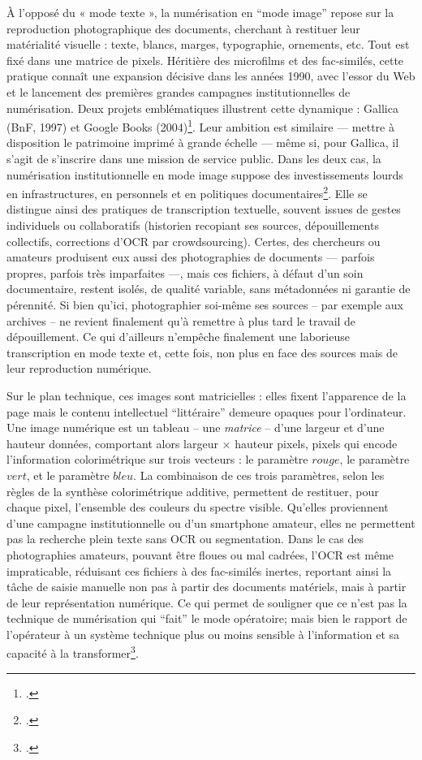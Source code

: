 À l’opposé du « mode texte », la numérisation en \enquote{mode image} repose sur la reproduction photographique des documents, cherchant à restituer leur matérialité visuelle : texte, blancs, marges, typographie, ornements, etc. Tout est fixé dans une matrice de pixels. Héritière des microfilms et des fac-similés, cette pratique connaît une expansion décisive dans les années 1990, avec l’essor du Web et le lancement des premières grandes campagnes institutionnelles de numérisation. Deux projets emblématiques illustrent cette dynamique : Gallica (BnF, 1997) et Google Books (2004)\footcite[][]{bermesbook}. Leur ambition est similaire — mettre à disposition le patrimoine imprimé à grande échelle — même si, pour Gallica, il s'agit de s’inscrire dans une mission de service public. Dans les deux cas, la numérisation institutionnelle en mode image suppose des investissements lourds en infrastructures, en personnels et en politiques documentaires\footcite[][p. 66-88]{claerr}. Elle se distingue ainsi des pratiques de transcription textuelle, souvent issues de gestes individuels ou collaboratifs (historien recopiant ses sources, dépouillements collectifs, corrections d’OCR par crowdsourcing). Certes, des chercheurs ou amateurs produisent eux aussi des photographies de documents — parfois propres, parfois très imparfaites —, mais ces fichiers, à défaut d'un soin documentaire, restent isolés, de qualité variable, sans métadonnées ni garantie de pérennité. Si bien qu'ici, photographier soi-même ses sources -- par exemple aux archives -- ne revient finalement qu'à remettre à plus tard le travail de dépouillement. Ce qui d'ailleurs n'empêche finalement une laborieuse transcription en mode texte et, cette fois, non plus en face des sources mais de leur reproduction numérique. 

Sur le plan technique, ces images sont matricielles : elles fixent l’apparence de la page mais le contenu intellectuel \enquote{littéraire} demeure opaques pour l’ordinateur. Une image numérique est un tableau -- une \emph{matrice} -- d'une largeur et d'une hauteur données, comportant alors largeur $\times$ hauteur pixels, pixels qui encode l'information colorimétrique sur trois vecteurs : le paramètre $rouge$, le paramètre $vert$, et le paramètre $bleu$. La combinaison de ces trois paramètres, selon les règles de la synthèse colorimétrique additive, permettent de restituer, pour chaque pixel, l'ensemble des couleurs du spectre visible. Qu’elles proviennent d’une campagne institutionnelle ou d’un smartphone amateur, elles ne permettent pas la recherche plein texte sans OCR ou segmentation. Dans le cas des photographies amateurs, pouvant être floues ou mal cadrées, l’OCR est même impraticable, réduisant ces fichiers à des fac-similés inertes, reportant ainsi la tâche de saisie manuelle non pas à partir des documents matériels, mais à partir de leur représentation numérique. Ce qui permet de souligner que ce n'est pas la technique de numérisation qui \enquote{fait} le mode opératoire; mais bien le rapport de l'opérateur à un système technique plus ou moins sensible à l'information et sa capacité à la transformer\footcite[][]{meot}.

